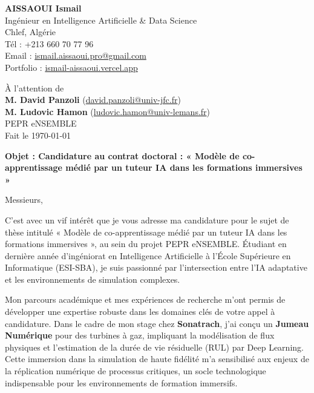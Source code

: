 \documentclass[a4paper,11pt]{article}
\begin{document}
\begin{flushleft}
    \textbf{AISSAOUI Ismail} \\
    Ingénieur en Intelligence Artificielle \& Data Science \\
    Chlef, Algérie \\
    Tél : +213 660 70 77 96 \\
    Email : \href{mailto:ismail.aissaoui.pro@gmail.com}{ismail.aissaoui.pro@gmail.com} \\
    Portfolio : \href{https://ismail-aissaoui.vercel.app}{ismail-aissaoui.vercel.app}
\end{flushleft}

\begin{flushright}
    À l'attention de \\
    \textbf{M. David Panzoli} (\href{mailto:david.panzoli@univ-jfc.fr}{david.panzoli@univ-jfc.fr}) \\
    \textbf{M. Ludovic Hamon} (\href{mailto:ludovic.hamon@univ-lemans.fr}{ludovic.hamon@univ-lemans.fr}) \\
    PEPR eNSEMBLE \\
    Fait le \today
\end{flushright}

\vspace{0.5cm}

\noindent \textbf{Objet : Candidature au contrat doctoral : « Modèle de co-apprentissage médié par un tuteur IA dans les formations immersives »}

\vspace{0.5cm}

Messieurs,

\medskip

C'est avec un vif intérêt que je vous adresse ma candidature pour le sujet de thèse intitulé « Modèle de co-apprentissage médié par un tuteur IA dans les formations immersives », au sein du projet PEPR eNSEMBLE. Étudiant en dernière année d'ingéniorat en Intelligence Artificielle à l'École Supérieure en Informatique (ESI-SBA), je suis passionné par l'intersection entre l'IA adaptative et les environnements de simulation complexes.

Mon parcours académique et mes expériences de recherche m'ont permis de développer une expertise robuste dans les domaines clés de votre appel à candidature. Dans le cadre de mon stage chez \textbf{Sonatrach}, j'ai conçu un \textbf{Jumeau Numérique} pour des turbines à gaz, impliquant la modélisation de flux physiques et l'estimation de la durée de vie résiduelle (RUL) par Deep Learning. Cette immersion dans la simulation de haute fidélité m'a sensibilisé aux enjeux de la réplication numérique de processus critiques, un socle technologique indispensable pour les environnements de formation immersifs.
\end{document}
